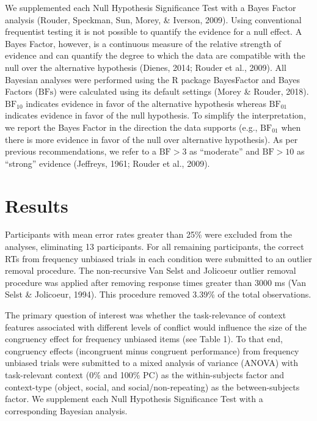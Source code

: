 \documentclass[english,,man,floatsintext]{apa6}
\begin{document}
We supplemented each Null Hypothesis Significance Test with a Bayes Factor analysis (Rouder, Speckman, Sun, Morey, \& Iverson, 2009). Using conventional frequentist testing it is not possible to quantify the evidence for a null effect. A Bayes Factor, however, is a continuous measure of the relative strength of evidence and can quantify the degree to which the data are compatible with the null over the alternative hypothesis (Dienes, 2014; Rouder et al., 2009). All Bayesian analyses were performed using the R package BayesFactor and Bayes Factors (\(\mathrm{BFs}\)) were calculated using its default settings (Morey \& Rouder, 2018). \(\mathrm{BF}_{\textrm{10}}\) indicates evidence in favor of the alternative hypothesis whereas \(\mathrm{BF}_{\textrm{01}}\) indicates evidence in favor of the null hypothesis. To simplify the interpretation, we report the Bayes Factor in the direction the data supports (e.g., \(\mathrm{BF}_{\textrm{01}}\) when there is more evidence in favor of the null over alternative hypothesis). As per previous recommendations, we refer to a \(\mathrm{BF > 3}\) as \enquote{moderate} and \(\mathrm{BF > 10}\) as \enquote{strong} evidence (Jeffreys, 1961; Rouder et al., 2009).

\hypertarget{results}{%
\section{Results}\label{results}}

Participants with mean error rates greater than 25\% were excluded from the analyses, eliminating 13 participants. For all remaining participants, the correct RTs from frequency unbiased trials in each condition were submitted to an outlier removal procedure. The non-recursive Van Selst and Jolicoeur outlier removal procedure was applied after removing response times greater than 3000 ms (Van Selst \& Jolicoeur, 1994). This procedure removed 3.39\% of the total observations.

The primary question of interest was whether the task-relevance of context features associated with different levels of conflict would influence the size of the congruency effect for frequency unbiased items (see Table 1). To that end, congruency effects (incongruent minus congruent performance) from frequency unbiased trials were submitted to a mixed analysis of variance (ANOVA) with task-relevant context (0\% and 100\% PC) as the within-subjects factor and context-type (object, social, and social/non-repeating) as the between-subjects factor. We supplement each Null Hypothesis Significance Test with a corresponding Bayesian analysis.
\end{document}
